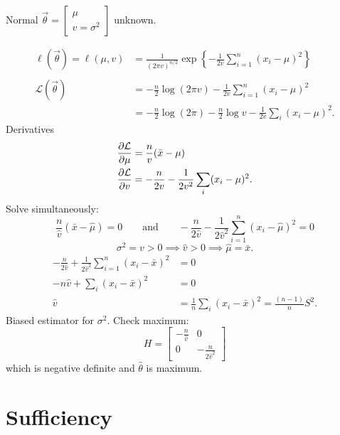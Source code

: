 \documentclass[10pt, a4paper]{article}
\begin{document}
\begin{example}
    Normal $\vec{\theta} = \begin{bmatrix}
        \mu \\ v = \sigma ^ 2
    \end{bmatrix}$ unknown.

    \begin{align*}
        \ell(\vec{\theta}) = \ell(\mu, v) &= \frac{1}{(2\pi v) ^ {n / 2}}\exp\left\{-\frac{1}{2v}\sum_{i = 1}^{n}(x_i - \mu) ^ 2\right\} \\ \\
        \mathcal{L}(\vec{\theta}) &= -\frac{n}{2}\log(2\pi v) - \frac{1}{2v}\sum_{i = 1}^{n}(x_i - \mu) ^ 2 \\
        &= -\frac{n}{2}\log(2\pi) - \frac{n}{2}\log{v} - \frac{1}{2v}\sum_{i}(x_i - \mu) ^ 2.
    \end{align*}
    Derivatives
    \begin{align*}
        \pd[\mathcal{L}]{\mu} &= \frac{n}{v}(\bar{x} - \mu) \\
        \pd[\mathcal{L}]{v} &= -\frac{n}{2v} - \frac{1}{2v ^ 2}\sum_{i}(x_i - \mu) ^ 2.
    \end{align*}
    Solve simultaneously:
    \[
    \frac{n}{\hat{v}}(\bar{x} - \hat{\mu}) = 0\qquad\text{and}\qquad -\frac{n}{2\hat{v}} - \frac{1}{2\hat{v} ^ 2}\sum_{i = 1}^{n}(x_i - \hat{\mu}) ^ 2 = 0
    \]
    \[
    \sigma ^ 2 = v > 0 \implies \hat{v} > 0 \implies \hat{\mu} = \bar{x}.
    \]
    \begin{align*}
        -\frac{n}{2\hat{v}} + \frac{1}{2\hat{v} ^ 2}\sum_{i = 1}^{n}(x_i - \bar{x}) ^ 2 &= 0 \\
        - n\hat{v} + \sum_{i}(x_i - \bar{x}) ^ 2 & = 0 \\
        \hat{v} &= \frac{1}{n}\sum_{i}(x_i - \bar{x}) ^ 2 = \frac{(n - 1)}{n}S ^ 2.
    \end{align*}
    Biased estimator for $\sigma ^ 2$.
    Check maximum:
    \[
    H = \begin{bmatrix}
        -\frac{n}{\hat{v}} & 0 \\
        0 & -\frac{n}{2\hat{v} ^ 2}
    \end{bmatrix}
    \]
    which is negative definite and $\hat{\theta}$ is maximum.
\end{example}

\newpage

\section{Sufficiency}
\end{document}
